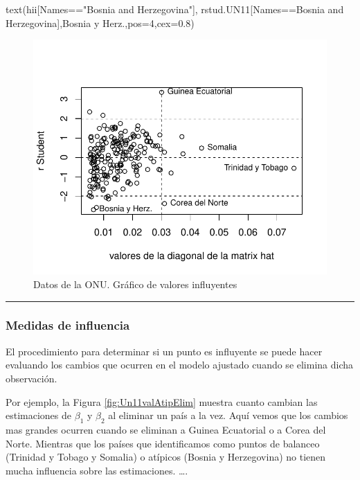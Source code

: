 \documentclass[
]{article}
\newenvironment{Shaded}{\begin{snugshade}}{\end{snugshade}}
\newcommand{\AttributeTok}[1]{\textcolor[rgb]{0.77,0.63,0.00}{#1}}
\newcommand{\DecValTok}[1]{\textcolor[rgb]{0.00,0.00,0.81}{#1}}
\newcommand{\FloatTok}[1]{\textcolor[rgb]{0.00,0.00,0.81}{#1}}
\newcommand{\FunctionTok}[1]{\textcolor[rgb]{0.00,0.00,0.00}{#1}}
\newcommand{\NormalTok}[1]{#1}
\newcommand{\SpecialCharTok}[1]{\textcolor[rgb]{0.00,0.00,0.00}{#1}}
\newcommand{\StringTok}[1]{\textcolor[rgb]{0.31,0.60,0.02}{#1}}
\begin{document}
\begin{Shaded}
\begin{Highlighting}[]
\FunctionTok{text}\NormalTok{(hii[Names}\SpecialCharTok{==}\StringTok{"Bosnia and Herzegovina"}\NormalTok{],}
\NormalTok{     rstud.UN11[Names}\SpecialCharTok{==}\StringTok{\textquotesingle{}Bosnia and Herzegovina\textquotesingle{}}\NormalTok{],}\StringTok{\textquotesingle{}Bosnia y Herz.\textquotesingle{}}\NormalTok{,}\AttributeTok{pos=}\DecValTok{4}\NormalTok{,}\AttributeTok{cex=}\FloatTok{0.8}\NormalTok{)}
\end{Highlighting}
\end{Shaded}

\begin{figure}

{\centering \includegraphics{MLGI_files/figure-latex/Un11valAtip-1} 

}

\caption{Datos de la ONU. Gráfico de valores influyentes}\label{fig:Un11valAtip}
\end{figure}
\rule{\textwidth}{0.4pt}

\hypertarget{medidas-de-influencia}{%
\subsubsection{Medidas de influencia}\label{medidas-de-influencia}}

El procedimiento para determinar si un punto es influyente se puede hacer evaluando los cambios que ocurren en el modelo ajustado cuando se elimina dicha observación.

Por ejemplo, la Figura \ref{fig:Un11valAtipElim} muestra cuanto cambian las estimaciones de \(\beta_{1}\) y \(\beta_{2}\) al eliminar un país a la vez. Aquí vemos que los cambios mas grandes ocurren cuando se eliminan a Guinea Ecuatorial o a Corea del Norte. Mientras que los países que identificamos como puntos de balanceo (Trinidad y Tobago y Somalia) o atípicos (Bosnia y Herzegovina) no tienen mucha influencia sobre las estimaciones.
\ldots.
\end{document}
